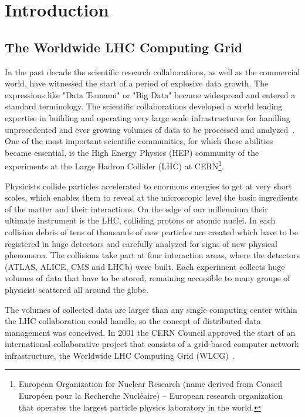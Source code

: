 \chapter*{Introduction}

\section*{The Worldwide LHC Computing Grid}

In the past decade the scientific research collaborations, as well as the
commercial world, have witnessed the start of a  period  of  explosive
data growth. The expressions like "Data Tsunami" or "Big Data" became widespread
and entered a standard terminology. The scientific collaborations developed a
world leading expertise in building and operating very large scale infrastructures for
handling unprecedented and ever growing volumes of data to be processed and analyzed~\cite{OSC}.  
One of the most important scientific communities,
for which these abilities became essential, is the High Energy Physics (HEP) community of 
the experiments at the Large Hadron
Collider (LHC) at CERN\footnote{European Organization for Nuclear Research 
(name derived from Conseil Européen pour la Recherche Nucléaire) -- European research organization that operates 
the largest particle physics laboratory in the world.}.

Physicists collide particles accelerated to enormous energies to get at very short scales, which enables them to
reveal at the microscopic level the basic ingredients of the matter and their interactions. 
On the edge of our millennium their ultimate instrument is the LHC, colliding protons or 
atomic nuclei. In each 
collision debris of tens of thousands of new particles are created which have to be registered in huge detectors 
and carefully analyzed for signs of new physical phenomena. The collisions take part at four interaction areas, 
where the detectors (ATLAS, ALICE, CMS and LHCb) were built. Each experiment collects huge volumes of data that have
to be stored, remaining accessible to many groups of physicist scattered all around the globe.

The volumes of collected data are larger than
any single computing center within the LHC collaboration could handle, so the concept of 
distributed data management was conceived. In 2001 the CERN Council approved the start of an international 
collaborative project that consists of a grid-based computer network infrastructure, the Worldwide LHC Computing 
Grid (WLCG)~\cite{happyBday}. 


